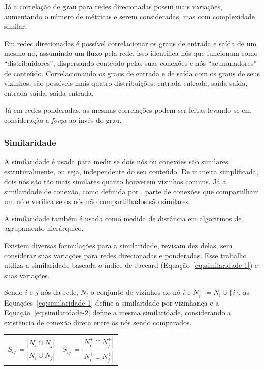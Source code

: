 \documentclass[12pt,a4paper]{article}
\theoremstyle{hypo}
\newcommand{\defn}{\coloneqq} %
\begin{document}
Já a correlação de grau para redes direcionadas possui mais variações, aumentando o número de métricas e serem consideradas, mas com complexidade similar.

Em redes direcionadas é possível correlacionar os graus de entrada e saída de um mesmo nó, assumindo um fluxo pela rede, isso identifica nós que funcionam como \enquote{distribuidores}, dispersando conteúdo pelas suas conexões e nós \enquote{acumuladores} de conteúdo. Correlacionando os graus de entrada e de saída com  os graus de seus vizinhos, são possíveis mais quatro distribuições: entrada-entrada, saída-saída, entrada-saída, saída-entrada.

Já em redes ponderadas, as mesmas correlações podem ser feitas levando-se em consideração a \textit{força} ao invés do grau.

\subsubsection{Similaridade}

A similaridade é usada para medir se dois nós ou conexões são similares estruturalmente, ou seja, independente do seu conteúdo. De maneira simplificada, dois nós são tão mais similares quanto houverem vizinhos comuns. Já a similaridade de conexão, como definida por , parte de conexões que compartilham um nó e verifica se os nós não compartilhados são similares.

A similaridade também é usada como medida de distância em algoritmos de agrupamento hierárquico.

Existem diversas formulações para a similaridade,  revisam dez delas, sem considerar suas variações para redes direcionadas e ponderadas. Esse trabalho utiliza a similaridade baseada o índice de Jaccard (Equação~\ref{eq:similaridade-1}) e suas variações.

Sendo $i$ e $j$ nós da rede, $N_i$ o conjunto de vizinhos do nó $i$ e $N_i^+ \defn N_i \cup \{i\}$, as Equações~\ref{eq:similaridade-1} define a similaridade por vizinhança e a Equação~\ref{eq:similaridade-2} define a mesma similaridade, considerando a existência de conexão direta entre os nós sendo comparados.

\noindent
\begin{tabularx}{\linewidth}{@{}XX@{}}
    \begin{equation} \label{eq:similaridade-1}
        S_{ij} \defn \frac{|N_i \cap N_j|}{|N_i \cup N_j|} 
    \end{equation} &
    \begin{equation} \label{eq:similaridade-2}
        S_{ij}^+ \defn \frac{|N_i^+ \cap N_j^+|}{|N_i^+ \cup N_j^+|} 
    \end{equation}
\end{tabularx}
\end{document}
